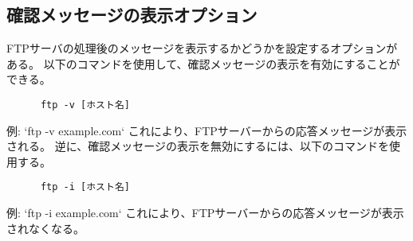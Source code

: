 \documentclass[a4paper,10pt]{jsarticle}
\begin{document}
    \subsection{確認メッセージの表示オプション}
    FTPサーバの処理後のメッセージを表示するかどうかを設定するオプションがある。
    以下のコマンドを使用して、確認メッセージの表示を有効にすることができる。
    \begin{lstlisting}
      ftp -v [ホスト名]
    \end{lstlisting}
    例: `ftp -v example.com`
    これにより、FTPサーバーからの応答メッセージが表示される。
    逆に、確認メッセージの表示を無効にするには、以下のコマンドを使用する。
    \begin{lstlisting}
      ftp -i [ホスト名]
    \end{lstlisting}
    例: `ftp -i example.com`
    これにより、FTPサーバーからの応答メッセージが表示されなくなる。
\end{document}
